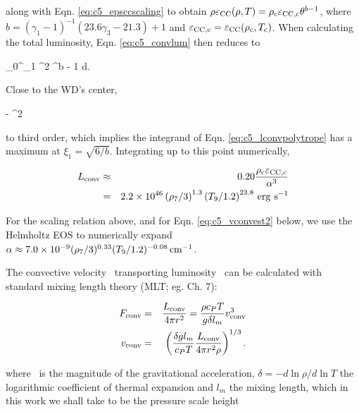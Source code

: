 \noindent along with Eqn. \ref{eq:c5_epsccscaling} to obtain $\rho\epscc(\rho, T) = \rhoc\epscentral\theta^{b - 1}$, where $b = (\gamma_1 - 1)^{-1}(23.6\gamma_3 - 21.3) + 1$ and $\epscentral = \epscc(\rhoc, \Tc)$.  When calculating the total luminosity, Eqn. \ref{eq:c5_convlum} then reduces to

\eqbegin
\Lconv {}\pi\rhoc\epscentral{}\int_0^{\xi_1} \xi^2 \theta^{b - 1} d\xi.
\label{eq:c5_lconvpolytrope}
\eqend

\noindent Close to the WD's center, 

\eqbegin
\theta {} - \xi^2
\label{eq:c5_theta_approx}
\eqend

\noindent to third order, which implies the integrand of Eqn. \ref{eq:c5_lconvpolytrope} has a maximum at $\xi_1 = \sqrt{6/b}$.  Integrating {\charles up to this point} numerically,

\begin{eqnarray}
\Lconv &\approx& 0.20\frac{\rhoc\epscentral}{\alpha^3}  \nonumber \\
&=& 2.2\times10^{46}\left(\rho_7/3\right)^{1.3}\left(T_9/1.2\right)^{23.8}\,\mrm{erg}\,\,\mrm{s}^{-1}
\label{eq:c5_convlumred}
\end{eqnarray}

\noindent For the scaling relation above, and for Eqn. \ref{eq:c5_vconvest2} below, we use the Helmholtz EOS to numerically expand $\alpha \approx 7.0\times10^{-9}(\rho_7/3)^{0.33}(T_9/1.2)^{-0.08}\,\mathrm{cm}^{-1}$.


The convective velocity \vconv\ transporting luminosity \Lconv\ can be calculated with standard mixing length theory (MLT; eg. \citealt{kippww12} Ch. 7):

\begin{eqnarray}
\Fconv &=& \frac{\Lconv}{4\pi r^2} = \frac{\rho c_PT}{\gacc\delta l_m} \vconv^3 \nonumber \\
\vconv &=& \left(\frac{\delta \gacc l_m}{c_P T}\frac{\Lconv}{4\pi r^2 \rho}\right)^{1/3}.
\label{eq:c5_vconv_mlt}
\end{eqnarray}


\noindent where \gacc\ is the magnitude of the gravitational acceleration, $\delta = -d\ln\rho/d\ln T$ the logarithmic coefficient of thermal expansion and $l_m$ the mixing length, which in this work we shall take to be the pressure scale height

